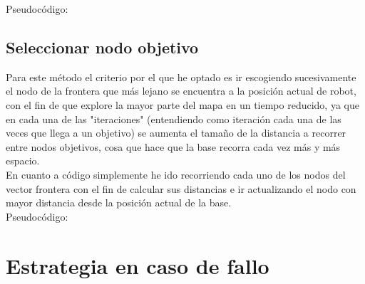 Pseudocódigo:


\begin{algorithmic}[1]
			\EndIf
		\EndFor
	\EndFor
\end{algorithmic}


\subsection{Seleccionar nodo objetivo}

Para este método el criterio por el que he optado es ir escogiendo sucesivamente el nodo de la frontera que más lejano se encuentra a la posición actual de robot, con el fin de que explore la mayor parte del mapa en
un tiempo reducido, ya que en cada una de las "iteraciones" (entendiendo como iteración cada una de las veces que llega a un objetivo) se aumenta el tamaño de la distancia a recorrer entre nodos objetivos, cosa que hace que la base recorra cada vez más y más espacio.\\
En cuanto a código simplemente he ido recorriendo cada uno de los nodos del vector frontera con el fin de calcular sus distancias e ir actualizando el nodo con mayor distancia desde la posición actual de la base.\\

Pseudocódigo:

\begin{algorithmic}[1]
	\EndIf
	\EndFor
\end{algorithmic}

\newpage

\section{Estrategia en caso de fallo}

